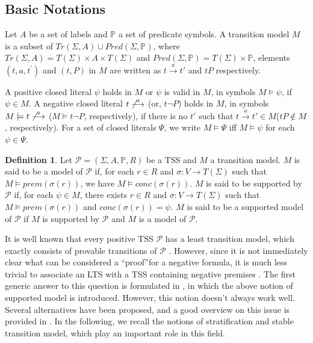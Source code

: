 \documentclass{elsarticle}
\theoremstyle{plain}
\theoremstyle{definition}
\newtheorem{mydefn}[theorem]{Definition}
\begin{document}
\subsection{Basic Notations}

Let $A$ be a set of labels and $\mathbb{P}$   a set of predicate symbols. A transition model $M$ is a subset of $Tr(\Sigma ,A)\cup Pred(\Sigma ,\mathbb{P} )$, where $Tr(\Sigma ,A)=T(\Sigma)\times A\times T(\Sigma )$ and $Pred(\Sigma ,\mathbb{P} )=T(\Sigma )\times \mathbb{P}$, elements $(t,a,t^{\prime })$ and $(t,P)$ in $M$ are written as $t \stackrel{a}{\longrightarrow} t'$ and $tP$ respectively.


     A positive closed literal $\psi$ holds in $M$ or $\psi$ is valid in $M$, in symbols $M\models \psi$, if $\psi \in M$. A negative closed literal  $t \not \stackrel{a}{\longrightarrow}$ (or, $t \neg P$) holds in $M$, in symbols $M \models t \not \stackrel{a}{\longrightarrow}$ ($M \models t \neg P$, respectively), if there is no $t'$ such that $t \stackrel{a}{\longrightarrow} t' \in M$($tP \notin M$, respectively). For a set of closed literals $\Psi$, we write $M \models \Psi$ iff $M \models \psi$ for each $\psi \in \Psi$.

\begin{mydefn}
Let $\mathcal{P}=(\Sigma,A,\mathbb{P},R)$ be a TSS and $M$ a transition model.
    $M$ is said to be a model of $\mathcal{P}$ if, for each $r\in R$ and $\sigma:V \longrightarrow T(\Sigma)$ such that $M \models prem(\sigma(r))$, we have $M \models conc(\sigma(r))$.
    $M$ is said to be supported by $\mathcal{P}$ if, for each $\psi \in M$, there exists $r \in R$ and $\sigma:V \longrightarrow T(\Sigma)$ such that $M \models prem(\sigma(r))$ and $conc(\sigma(r))=\psi$.
    $M$ is said to be a supported model of $\mathcal{P}$ if $M$ is supported by $\mathcal{P}$ and $M$ is a model of $\mathcal{P}$.
\end{mydefn}

It is well known that every positive TSS $\mathcal P$ has a least transition model, which exactly consists of provable transitions of $\mathcal P$ \cite{Bol96}.
However, since it is not immediately clear what can be considered a \textquotedblleft proof\textquotedblright for a negative formula, it is much less trivial to associate an LTS with a TSS containing negative premises \cite{Groote93}.
The first generic answer to this question is formulated in \cite{Bloom95,Groote93}, in which the above notion of supported model is introduced.
However, this notion doesn't always work well. Several alternatives have been proposed, and a good overview on this issue is provided in \cite{Glabbeek04}.
In the following, we recall the notions of stratification and stable transition model, which play an important role in this field.
\end{document}
